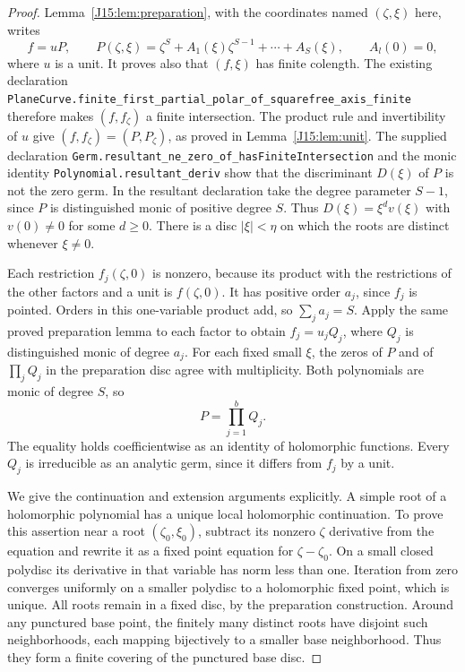 \documentclass[11pt,oneside]{report}
\theoremstyle{definition}
\numberwithin{equation}{section}
\newcommand{\decl}[1]{\textnormal{\nolinkurl{#1}}}
\begin{document}
\begin{proof}
Lemma~\ref{J15:lem:preparation}, with the coordinates named
$(\zeta,\xi)$ here, writes
\[
 f=uP,\qquad P(\zeta,\xi)=\zeta^S+
       A_1(\xi)\zeta^{S-1}+\cdots+A_S(\xi),
 \qquad A_l(0)=0,
\]
where $u$ is a unit. It proves also that $(f,\xi)$ has finite
colength. The existing declaration
\decl{PlaneCurve.finite_first_partial_polar_of_squarefree_axis_finite}
therefore makes $(f,f_\zeta)$ a finite intersection.
The product rule and invertibility of $u$ give
$(f,f_\zeta)=(P,P_\zeta)$, as proved in Lemma~\ref{J15:lem:unit}.
The supplied declaration
\decl{Germ.resultant_ne_zero_of_hasFiniteIntersection}
and the monic identity \decl{Polynomial.resultant_deriv} show that
the discriminant $D(\xi)$ of $P$ is not the zero germ. In the resultant
declaration take the degree parameter $S-1$, since $P$ is distinguished
monic of positive degree $S$.
Thus $D(\xi)=\xi^d v(\xi)$ with $v(0)\ne0$ for some $d\geq0$.
There is a disc $|\xi|<\eta$ on which the roots are distinct whenever
$\xi\ne0$.

Each restriction $f_j(\zeta,0)$ is nonzero, because its product with
the restrictions of the other factors and a unit is $f(\zeta,0)$.
It has positive order $a_j$, since $f_j$ is pointed. Orders in this
one-variable product add, so $\sum_j a_j=S$.
Apply the same proved preparation lemma to each factor to obtain
$f_j=u_jQ_j$, where $Q_j$ is distinguished monic of degree $a_j$.
For each fixed small $\xi$, the zeros of $P$ and of $\prod_jQ_j$
in the preparation disc agree with multiplicity. Both polynomials are
monic of degree $S$, so
\begin{equation}\label{J14:eq:root-cover-factor}
 P=\prod_{j=1}^bQ_j.
\end{equation}
The equality holds coefficientwise as an identity of holomorphic
functions. Every $Q_j$ is irreducible as an analytic germ, since it
differs from $f_j$ by a unit.

We give the continuation and extension arguments explicitly.
A simple root of a holomorphic polynomial has a unique local
holomorphic continuation. To prove this assertion near a root
$(\zeta_0,\xi_0)$, subtract its nonzero $\zeta$ derivative from
the equation and rewrite it as a fixed point equation for
$\zeta-\zeta_0$. On a small closed polydisc its derivative in that
variable has norm less than one. Iteration from zero converges
uniformly on a smaller polydisc to a holomorphic fixed point, which
is unique. All roots remain in a fixed disc, by the preparation
construction. Around any punctured base point, the finitely many
distinct roots have disjoint such neighborhoods, each mapping
bijectively to a smaller base neighborhood. Thus they form a finite
covering of the punctured base disc.


\end{proof}
\end{document}
